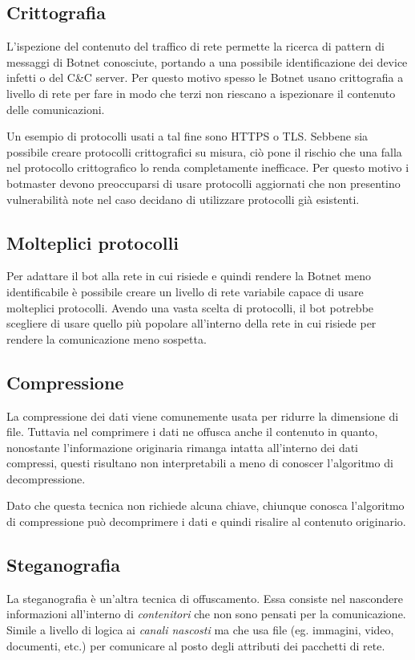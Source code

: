  \subsection*{Crittografia}
 L'ispezione del contenuto del traffico di rete permette la ricerca di pattern di messaggi  di Botnet conosciute, portando a una possibile identificazione dei device infetti o del C\&C server. 
 Per questo motivo spesso le Botnet usano crittografia a livello di rete per fare in modo che terzi non riescano a ispezionare il contenuto delle comunicazioni. 

 Un esempio di protocolli usati a tal fine sono HTTPS o TLS. Sebbene sia possibile creare protocolli crittografici su misura, ciò pone il rischio che una falla nel protocollo crittografico lo renda completamente inefficace. Per questo motivo i botmaster devono preoccuparsi di usare protocolli aggiornati che non presentino vulnerabilità note nel caso decidano di utilizzare protocolli già esistenti.

 \subsection*{Molteplici protocolli}
 Per adattare il bot alla rete in cui risiede e quindi rendere la Botnet meno identificabile è possibile creare un livello di rete variabile capace di usare molteplici protocolli. Avendo una vasta scelta di protocolli, il bot potrebbe scegliere di usare quello più popolare all'interno della rete in cui risiede per rendere la comunicazione meno sospetta.

 \subsection*{Compressione}
 La compressione dei dati viene comunemente usata per ridurre la dimensione di file. Tuttavia nel comprimere i dati ne offusca anche il contenuto in quanto, nonostante l'informazione originaria rimanga intatta all'interno dei dati compressi, questi risultano non interpretabili a meno di conoscer l'algoritmo di decompressione.
 
 Dato che questa tecnica non richiede alcuna chiave, chiunque conosca l'algoritmo di compressione può  decomprimere i dati e quindi risalire al contenuto originario.

 \subsection*{Steganografia}
 La steganografia è un'altra tecnica di offuscamento. Essa consiste nel nascondere informazioni all'interno di \textit{contenitori} che non sono pensati per la comunicazione. Simile a livello di logica ai \textit{canali nascosti} ma che usa file (eg. immagini, video, documenti, etc.) per comunicare al posto degli attributi dei  pacchetti di rete.

